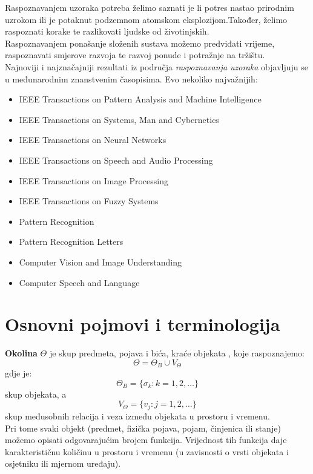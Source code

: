 \documentclass{book}
\begin{document}
Raspoznavanjem uzoraka potreba želimo saznati je li potres nastao prirodnim
uzrokom ili je potaknut podzemnom atomskom eksplozijom.Također, želimo
raspoznati korake te razlikovati ljudske od životinjskih. \\
   

Raspoznavanjem ponašanje složenih sustava možemo predviđati vrijeme,
raspoznavati smjerove razvoja te razvoj ponude i potražnje na tržištu. \\


 Najnoviji i najznačajniji
 rezultati iz područja \textit{raspoznavanja uzoraka} objavljuju se  u
 međunarodnim znanstvenim časopisima. Evo nekoliko najvažnijih:

\begin{itemize}
  \item IEEE Transactions on Pattern Analysis and Machine Intelligence
  \item IEEE Transactions on Systems, Man and Cybernetics
  \item IEEE Transactions on Neural Networks
  \item IEEE Transactions on Speech and Audio Processing
  \item IEEE Transactions on Image Processing
  \item IEEE Transactions on Fuzzy Systems
  \item Pattern Recognition
  \item Pattern Recognition Letters
  \item Computer Vision and Image Understanding
  \item Computer Speech and Language 
\end{itemize}


\section{Osnovni pojmovi i terminologija}

 
 \textbf{Okolina}
$\Theta$ je skup predmeta, pojava  i bića, kraće objekata , koje raspoznajemo: 
$$ \Theta = \Theta_B \cup V_{\Theta} $$ gdje  je: $$ \Theta_B = \{ \sigma_k : k
= 1,2, \ldots \}  $$ skup objekata,  a $$ V_{\Theta} = \{ v_j : j = 1,2,\ldots
\} $$ skup međusobnih relacija i  veza između objekata u prostoru i vremenu. \\

Pri tome svaki objekt (predmet, fizička pojava, pojam, činjenica ili
stanje) možemo opisati odgovarajućim brojem funkcija. Vrijednost tih funkcija
daje karakterističnu količinu u prostoru i vremenu (u zavisnosti o vrsti
objekata  i osjetniku ili mjernom uređaju). \\
\end{document}
